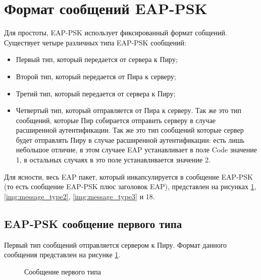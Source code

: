 \newpage
\section{Формат сообщений EAP-PSK}

Для простоты, EAP-PSK использует фиксированный формат собщений. Существует четыре различных типа EAP-PSK сообщений:

\begin{itemize}
\item Первый тип, который передается от сервера к Пиру;
\item Второй тип, который передается от Пира к серверу;
\item Третий тип, который передается от сервера к Пиру;
\item Четвертый тип, который отправляется от Пира к серверу. Так же это тип сообщений, которые Пир собирается отправить серверу в случае расширенной аутентификации. Так же это тип сообщений которые сервер будет отправлять Пиру в случае расширенной аутентификации: есть лишь небольшое отличие, в этом случаее EAP устанавливает в поле Code значение 1, в остальных случаях в это поле устанавливается значение 2.
\end{itemize}

Для ясности, весь EAP пакет, который инкапсулируется в сообщение EAP-PSK (то есть сообщение EAP-PSK плюс заголовок EAP), представлен на рисунках \ref{img:message_type1}, \ref{img:message_type2}, \ref{img:message_type3} и 18. %

\subsection{EAP-PSK сообщение первого типа}

Первый тип сообщений отправляется сервером к Пиру. Формат данного сообщения представлен на рисунке \ref{img:message_type1}.

\begin{figure}[h!]
\caption{Сообщение первого типа}
\label{img:message_type1}
\end{figure}

